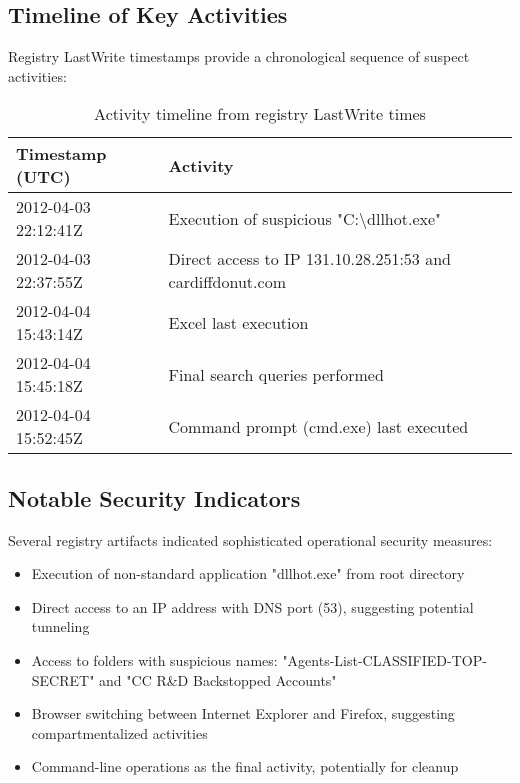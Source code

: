 \subsection{Timeline of Key Activities}
Registry LastWrite timestamps provide a chronological sequence of suspect activities:

\begin{table}[htbp]
    \centering
    \begin{tabular}{|p{4cm}|p{9cm}|}
        \hline
        \textbf{Timestamp (UTC)} & \textbf{Activity} \\
        \hline
        2012-04-03 22:12:41Z & Execution of suspicious "C:\textbackslash dllhot.exe" \\
        \hline
        2012-04-03 22:37:55Z & Direct access to IP 131.10.28.251:53 and cardiffdonut.com \\
        \hline
        2012-04-04 15:43:14Z & Excel last execution \\
        \hline
        2012-04-04 15:45:18Z & Final search queries performed \\
        \hline
        2012-04-04 15:52:45Z & Command prompt (cmd.exe) last executed \\
        \hline
    \end{tabular}
    \caption{Activity timeline from registry LastWrite times}
    \label{tab:activity_timeline}
\end{table}

\subsection{Notable Security Indicators}
Several registry artifacts indicated sophisticated operational security measures:

\begin{itemize}
    \item Execution of non-standard application "dllhot.exe" from root directory
    \item Direct access to an IP address with DNS port (53), suggesting potential tunneling
    \item Access to folders with suspicious names: "Agents-List-CLASSIFIED-TOP-SECRET" and "CC R\&D Backstopped Accounts"
    \item Browser switching between Internet Explorer and Firefox, suggesting compartmentalized activities
    \item Command-line operations as the final activity, potentially for cleanup
\end{itemize}

